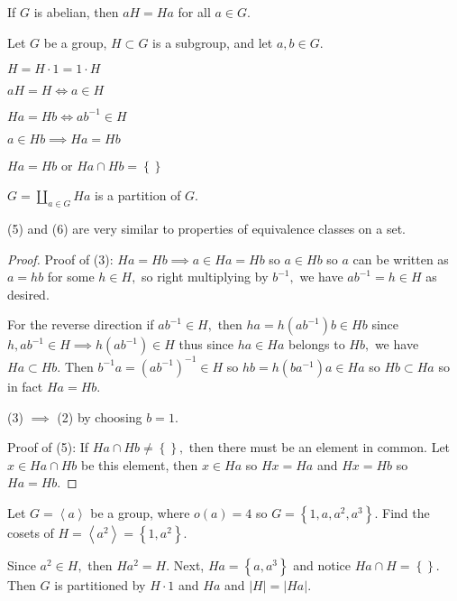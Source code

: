 \documentclass{article}
\begin{document}
\begin{remark}
	If $G$ is abelian, then $aH=Ha$ for all $a\in G.$
\end{remark}

\begin{theorem*}
	Let $G$ be a group, $H\subset G$ is a subgroup, and let $a, b\in G.$

	\begin{enumerate}[(1)]
		\ii $H=H\cdot 1=1\cdot H$

		\ii $aH=H\iff a\in H$

		\ii $Ha=Hb\iff ab^{-1}\in H$

		\ii $a\in Hb\implies Ha=Hb$

		\ii $Ha=Hb$ or $Ha\cap Hb=\left\{  \right\}$

		\ii $G=\displaystyle\coprod_{a\in G} Ha$ is a partition of $G.$
	\end{enumerate}
\end{theorem*}

\begin{remark}
	(5) and (6) are very similar to properties of equivalence classes on a set.
\end{remark}

\begin{proof}
	Proof of (3): $Ha=Hb\implies a\in Ha=Hb$ so $a\in Hb$ so $a$ can be written as $a=hb$ for some $h\in H,$ so right multiplying by $b^{-1},$ we have $ab^{-1}=h\in H$ as desired.

	For the reverse direction if $ab^{-1}\in H,$ then $ha=h(ab^{-1})b\in Hb$ since $h, ab^{-1}\in H\implies h(ab^{-1})\in H$ thus since $ha\in Ha$ belongs to $Hb,$ we have $Ha\subset Hb.$ Then $b^{-1}a=(ab^{-1})^{-1}\in H$ so $hb=h(ba^{-1})a\in Ha$ so $Hb\subset Ha$ so in fact $Ha=Hb.$

	(3) $\implies$ (2) by choosing $b=1.$

	Proof of (5): If $Ha\cap Hb\neq \left\{  \right\},$ then there must be an element in common. Let $x\in Ha\cap Hb$ be this element, then $x\in Ha$ so $Hx=Ha$ and $Hx=Hb$ so $Ha=Hb.$
\end{proof}

\begin{example}
	Let $G=\left< a\right>$ be a group, where $o(a)=4$ so $G=\left\{ 1, a, a^2, a^3 \right\}.$ Find the cosets of $H=\left< a^2\right>=\left\{ 1, a^2 \right\}.$ 

	Since $a^2\in H,$ then $Ha^2=H.$ Next, $Ha=\left\{ a, a^3 \right\}$ and notice $Ha\cap H=\left\{  \right\}.$ Then $G$ is partitioned by $H\cdot 1$ and $Ha$ and $|H|=|Ha|.$
\end{example}
\end{document}
